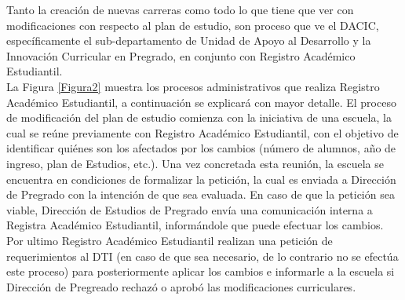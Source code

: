 \documentclass[12pt]{article}
\begin{document}
			Tanto la creación de nuevas carreras como todo lo que tiene que ver con modificaciones con respecto al plan de estudio, son proceso que ve el DACIC, específicamente el sub-departamento de Unidad de Apoyo al Desarrollo y la Innovación Curricular en Pregrado, en conjunto con Registro Académico Estudiantil.
			\\
			
			La Figura \ref{Figura2} muestra los procesos administrativos que realiza Registro Académico Estudiantil, a continuación se explicará con mayor detalle.
			El proceso de modificación del plan de estudio comienza con la iniciativa de una escuela, la cual se reúne previamente con Registro Académico Estudiantil, con el objetivo  de identificar quiénes son los afectados por los cambios (número de alumnos, año de ingreso, plan de Estudios, etc.). Una vez concretada esta reunión, la escuela se encuentra en condiciones de formalizar la petición, la cual es enviada a Dirección de Pregrado con la intención de que sea evaluada. En caso de que la petición sea viable, Dirección de Estudios de Pregrado envía una comunicación interna a Registra Académico Estudiantil, informándole que puede efectuar los cambios.
			\\
			
			 Por ultimo Registro Académico Estudiantil realizan una petición de requerimientos al DTI (en caso de que sea necesario, de lo contrario no se efectúa este proceso) para posteriormente aplicar los cambios e informarle a la escuela si Dirección de Pregreado rechazó o aprobó las modificaciones curriculares.
						
\end{document}
